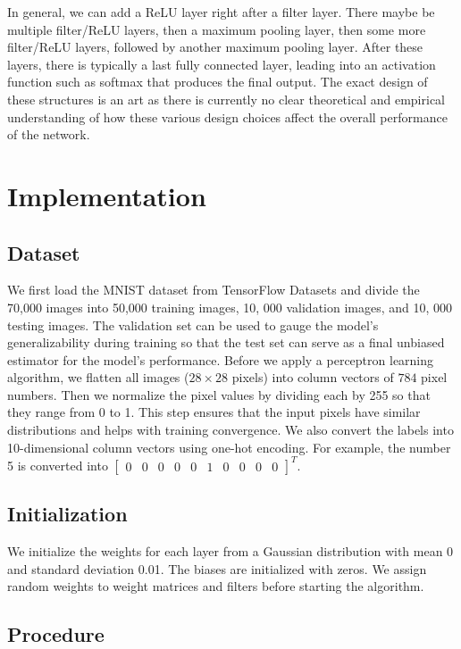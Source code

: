 \documentclass[11pt]{amsart}
\begin{document}
In general, we can add a ReLU layer right after a filter layer. There maybe be multiple filter/ReLU layers, then a maximum pooling layer, then some more filter/ReLU layers, followed by another maximum pooling layer. After these layers, there is typically a last fully connected layer, leading into an activation function such as softmax that produces the final output. The exact design of these structures is an art as there is currently no clear theoretical and empirical understanding of how these various design choices affect the overall performance of the network.

\section{Implementation}

\subsection{Dataset}

We first load the MNIST dataset from TensorFlow Datasets and divide the 70,000 images into 50,000 training images, 10, 000 validation images, and 10, 000 testing images. The validation set can be used to gauge the model's generalizability during training so that the test set can serve as a final unbiased estimator for the model's performance. Before we apply a perceptron learning algorithm, we flatten all images ($28\times 28$ pixels) into column vectors of $784$ pixel numbers. Then we normalize the pixel values by dividing each by 255 so that they range from 0 to 1. This step ensures that the input pixels have similar distributions and helps with training convergence. We also convert the labels into 10-dimensional column vectors using one-hot encoding. For example, the number 5 is converted into $\left[\begin{array}{cccccccccc} 0&0&0&0&0&1&0&0&0&0\end{array}\right]^T$.



\subsection{Initialization}
We initialize the weights for each layer from a Gaussian distribution with mean 0 and standard deviation 0.01. The biases are initialized with zeros. We assign random weights to weight matrices and filters before starting the algorithm.

\subsection{Procedure}
\end{document}
